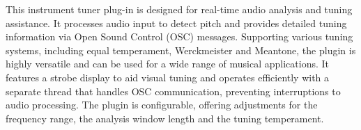 This instrument tuner plug-in is designed for real-time audio analysis and tuning assistance. It processes audio input to detect pitch and provides detailed tuning information via Open Sound Control (OSC) messages. Supporting various tuning systems, including equal temperament, Werckmeister and Meantone, the plugin is highly versatile and can be used for a wide range of musical applications. It features a strobe display to aid visual tuning and operates efficiently with a separate thread that handles OSC communication, preventing interruptions to audio processing. The plugin is configurable, offering adjustments for the frequency range, the analysis window length and the tuning temperament.




